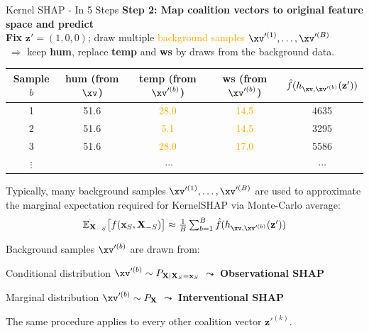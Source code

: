 \documentclass[10pt,compress,t,notes=noshow, xcolor=table]{beamer}
\begin{document}
\begin{framev}[fs=small,align=top]{Kernel SHAP - In 5 Steps}
\textbf{Step 2: Map coalition vectors to original feature space and predict}
\\%
\textbf{Fix} \(\mathbf{z}'=(1,0,0)\); draw multiple \textcolor{orange}{background samples $\xv'^{(1)}, \dots, \xv'^{(B)}$}\\
\(\;\Rightarrow\) keep \textbf{hum}, replace \textbf{temp} and \textbf{ws} by draws from the background data.
\begin{table}
\centering
\begin{small}
\begin{tabular}{c|ccc|c}
Sample \(b\) & hum (from \(\xv\)) & temp (from $\xv'^{(b)}$) & ws (from $\xv'^{(b)}$)  & \(\hat{f}(h_{\xv, \xv'^{(b)}}(\mathbf{z}'))\) \\
\hline
1 & 51.6 & \textcolor{orange}{28.0} & \textcolor{orange}{14.5} & 4635 \\
2 & 51.6 & \textcolor{orange}{5.1} & \textcolor{orange}{14.5} & 3295 \\
3 & 51.6 & \textcolor{orange}{28.0} & \textcolor{orange}{17.0} & 5586 \\
$\vdots$ & \multicolumn{3}{c}{$\cdots$} & $\cdots$ \\
\end{tabular}
\end{small}
\end{table}

\begin{itemizeM}
\item Typically, many background samples $\xv'^{(1)}, \dots, \xv'^{(B)}$ are used to approximate the marginal expectation required for KernelSHAP via Monte-Carlo average:
$$ \textstyle \mathbb{E}_{\mathbf{X}_{-S}}\bigl[f(\mathbf{x}_S,\mathbf{X}_{-S})\bigr] \approx
\frac{1}{B}\sum_{b=1}^{B}\hat{f}(h_{\xv, \xv'^{(b)}}(\mathbf{z}'))$$
\item Background samples \( \xv'^{(b)} \) are drawn from:
\begin{itemizeS}
\item Conditional distribution \( \xv'^{(b)} \sim P_{\mathbf{X} \mid \mathbf{X}_S = \mathbf{x}_S} \) $\leadsto$ \textbf{Observational SHAP}
\item Marginal distribution \( \xv'^{(b)} \sim P_{\mathbf{X}} \) $\leadsto$ \textbf{Interventional SHAP}
\end{itemizeS}
\item The same procedure applies to every other coalition vector \(\mathbf{z}'^{(k)}\).
\end{itemizeM}
\end{framev}
\end{document}
